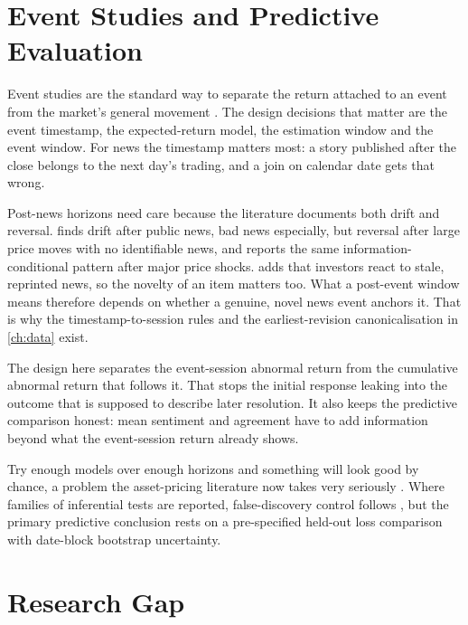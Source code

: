 \documentclass[11pt,a4paper,oneside]{book}
\let\textcite\citet
\let\Textcite\Citet
\let\parencite\citep
\begin{document}
\section{Event Studies and Predictive Evaluation}
\label{sec:lit-event-studies}

Event studies are the standard way to separate the return attached to an event from the market's general movement \parencite{mackinlay1997event}.
The design decisions that matter are the event timestamp, the expected-return model, the estimation window and the event window.
For news the timestamp matters most: a story published after the close belongs to the next day's trading, and a join on calendar date gets that wrong.

Post-news horizons need care because the literature documents both drift and reversal.
\Textcite{chan2003news} finds drift after public news, bad news especially, but reversal after large price moves with no identifiable news, and \textcite{savor2012information} reports the same information-conditional pattern after major price shocks.
\Textcite{tetlock2011stale} adds that investors react to stale, reprinted news, so the novelty of an item matters too.
What a post-event window means therefore depends on whether a genuine, novel news event anchors it.
That is why the timestamp-to-session rules and the earliest-revision canonicalisation in \cref{ch:data} exist.

The design here separates the event-session abnormal return from the cumulative abnormal return that follows it.
That stops the initial response leaking into the outcome that is supposed to describe later resolution.
It also keeps the predictive comparison honest: mean sentiment and agreement have to add information beyond what the event-session return already shows.

Try enough models over enough horizons and something will look good by chance, a problem the asset-pricing literature now takes very seriously \parencite{harvey2016multiple}.
Where families of inferential tests are reported, false-discovery control follows \textcite{benjamini1995fdr}, but the primary predictive conclusion rests on a pre-specified held-out loss comparison with date-block bootstrap uncertainty.

\section{Research Gap}
\label{sec:lit-gap}
\end{document}
